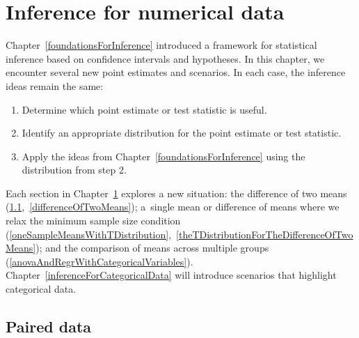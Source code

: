 \chapter{Inference for numerical data}
\label{inferenceForNumericalData}

Chapter~\ref{foundationsForInference} introduced a framework for statistical inference based on confidence intervals and hypotheses. In this chapter, we encounter several new point estimates and scenarios. In each case, the inference ideas remain the same:
\begin{enumerate}
\setlength{\itemsep}{0mm}
\item Determine which point estimate or test statistic is useful.
\item Identify an appropriate distribution for the point estimate or test statistic.
\item Apply the ideas from Chapter~\ref{foundationsForInference} using the distribution from step 2.
\end{enumerate}
Each section in Chapter~\ref{inferenceForNumericalData} explores a new situation: the difference of two means (\ref{pairedData},~\ref{differenceOfTwoMeans}); a~single mean or difference of means where we relax the minimum sample size condition (\ref{oneSampleMeansWithTDistribution},~\ref{theTDistributionForTheDifferenceOfTwoMeans}); and the comparison of means across multiple groups (\ref{anovaAndRegrWithCategoricalVariables}). Chapter~\ref{inferenceForCategoricalData} will introduce scenarios that highlight categorical data.













\section{Paired data}
\label{pairedData}

